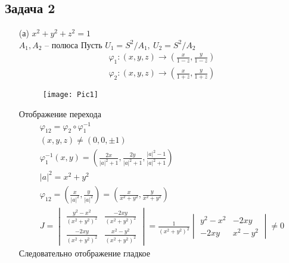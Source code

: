 \subsection*{Задача 2}
\begin{enumerate}
	\item[(а)]$x^2+y^2+z^2=1$\\
		$A_1, A_2$ -- полюса
		Пусть $U_1 = S^2 \slash A_1,\ U_2 = S^2 \slash A_2$
		\begin{gather*}
			\varphi_1: (x,y,z) \to \left(\frac{x}{1-z}, \frac{y}{1-z}\right)\\
			\varphi_2: (x,y,z) \to \left(\frac{x}{1+z}, \frac{y}{1+z}\right)
		\end{gather*}
		\begin{figure}[!h]
			\texttt{[image: Pic1]}
		\end{figure}
		\vskip 0.2in
		Отображение перехода\\
		\begin{gather*}
			\varphi_{12} = \varphi_2 \circ \varphi_1^{-1}\\
			(x,y,z) \ne (0,0,\pm 1)\\
			\varphi_1^{-1}(x,y) = \left(\frac{2x}{|a|^2+1}, \frac{2y}{|a|^2+1}, \frac{|a|^2-1}{|a|^2+1}\right)\\
			|a|^2=x^2+y^2\\
			\varphi_{12} = \left(\frac{x}{|a|^2}, \frac{y}{|a|^2}\right) = \left(\frac{x}{x^2+y^2}, \frac{y}{x^2+y^2}\right)\\
			J = 
			\begin{vmatrix}
				\frac{y^2-x^2}{(x^2+y^2)^2} & \frac{-2xy}{(x^2+y^2)^2}\\
				\frac{-2xy}{(x^2+y^2)^2} & \frac{x^2-y^2}{(x^2+y^2)^2}
			\end{vmatrix}
			=
			\frac{1}{(x^2+y^2)^2}
			\begin{vmatrix}
				y^2-x^2 & -2xy\\
				-2xy & x^2-y^2
			\end{vmatrix}
			\ne 0
		\end{gather*}
		Следовательно отображение гладкое
	

\end{enumerate}
